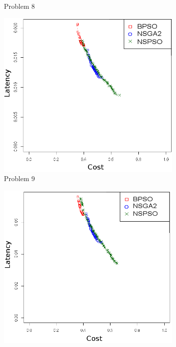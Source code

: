 \begin{figure}[t]
\begin{subfigure}{0.30\textwidth}
	   \caption{Problem 8}
   \end{subfigure}
      \begin{subfigure}{0.30\textwidth}
       \includegraphics[width=\textwidth]{pics/nsgabpso9.png}
	   \caption{Problem 9}
   \end{subfigure}
   \begin{subfigure}{0.30\textwidth}
       \includegraphics[width=\textwidth]{pics/nsgabpso10.png}

\end{subfigure}
\end{figure}
